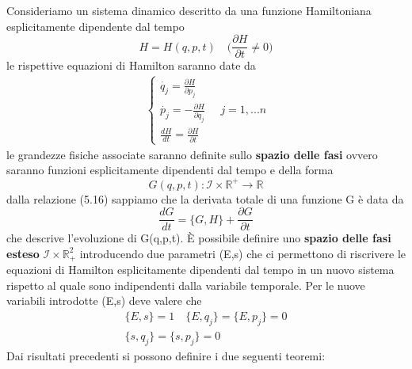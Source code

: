 Consideriamo un sistema dinamico descritto da una funzione Hamiltoniana esplicitamente dipendente dal tempo 
\begin{equation}
	H = H(q,p,t) \quad \Big (\frac{\partial H}{\partial t} \neq 0 \Big )
\end{equation}
le rispettive equazioni di Hamilton saranno date da
\begin{align}
	\begin{cases}
		\dot{q_j} = \frac{\partial H}{\partial p_j}\\
		\dot{p_j} = - \frac{\partial H}{\partial q_j}\\
		\frac{dH}{dt} = \frac{\partial H}{\partial t}
	\end{cases} \quad j = 1,...n
\end{align}
le grandezze fisiche associate saranno definite sullo \textbf{spazio delle fasi} ovvero saranno  funzioni esplicitamente dipendenti dal tempo e della forma
\begin{equation}
	G(q,p,t) : \mathcal{I} \times \mathbb{R^+} \rightarrow \mathbb{R}
\end{equation}
dalla relazione (5.16) sappiamo che la derivata totale di una funzione G \`{e} data da 
\begin{equation}
	\frac{d G}{dt} = \Big \{ G,H \Big \} + \frac{\partial G}{\partial t}
\end{equation}
che descrive l'evoluzione di G(q,p,t). \`{E} possibile definire uno \textbf{spazio delle fasi esteso} $\mathcal{I} \times \mathbb{R}^2_+$ introducendo due parametri (E,s) che ci permettono di riscrivere le equazioni di Hamilton esplicitamente dipendenti dal tempo in un nuovo sistema rispetto al quale sono indipendenti dalla variabile temporale.
Per le nuove variabili introdotte (E,s) deve valere che 
\begin{align}
	\{E,s \} = 1 \quad \{E,q_j \} = \{E,p_j\} = 0 \\
	\{s,q_j \} = \{s,p_j\} = 0 
\end{align}
Dai risultati precedenti si possono definire i due seguenti teoremi:

